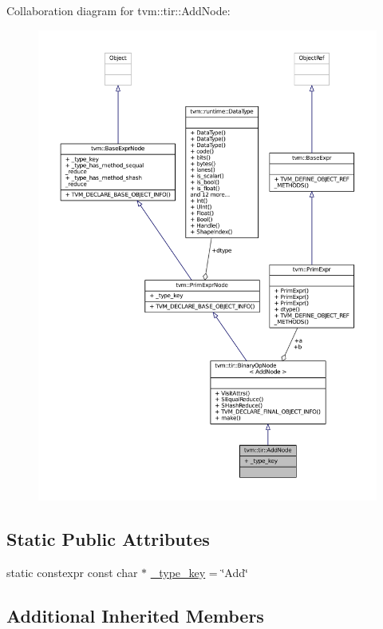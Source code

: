 Collaboration diagram for tvm\+:\+:tir\+:\+:Add\+Node\+:
\nopagebreak
\begin{figure}[H]
\begin{center}
\leavevmode
\includegraphics[width=350pt]{classtvm_1_1tir_1_1AddNode__coll__graph}
\end{center}
\end{figure}
\subsection*{Static Public Attributes}
\begin{DoxyCompactItemize}
\item 
static constexpr const char $\ast$ \hyperlink{classtvm_1_1tir_1_1AddNode_acb112a802dbe7e838fa6c51680220844}{\+\_\+type\+\_\+key} = \char`\"{}Add\char`\"{}
\end{DoxyCompactItemize}
\subsection*{Additional Inherited Members}


